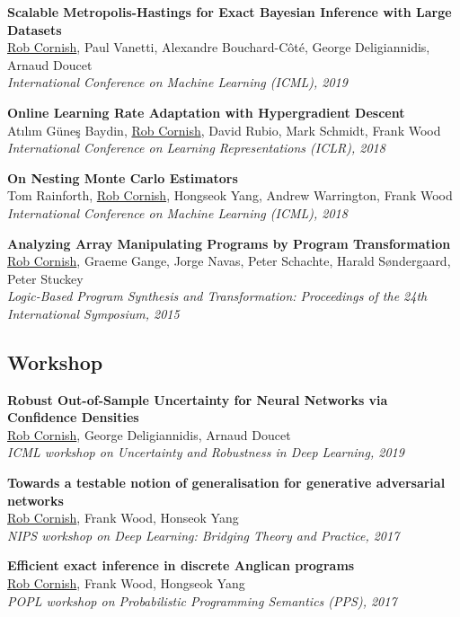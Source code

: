 \documentclass[12pt,a4paper]{article}
\begin{document}
\textbf{Scalable Metropolis-Hastings for Exact Bayesian Inference with Large Datasets} \\
\underline{Rob Cornish}, Paul Vanetti, Alexandre Bouchard-C\^ot\'e, George Deligiannidis, Arnaud Doucet \\
\textit{International Conference on Machine Learning (ICML), 2019}

\noindent
\textbf{Online Learning Rate Adaptation with Hypergradient Descent} \\
At\i l\i m G\"une\c s Baydin, \underline{Rob Cornish}, David Rubio, Mark Schmidt, Frank Wood \\
\textit{International Conference on Learning Representations (ICLR), 2018}

\noindent
\textbf{On Nesting Monte Carlo Estimators} \\
Tom Rainforth, \underline{Rob Cornish}, Hongseok Yang, Andrew Warrington, Frank Wood \\
\textit{International Conference on Machine Learning (ICML), 2018}

\noindent
\textbf{Analyzing Array Manipulating Programs by Program Transformation} \\
\underline{Rob Cornish}, Graeme Gange, Jorge Navas, Peter Schachte, Harald S\o ndergaard, Peter Stuckey \\
\textit{Logic-Based Program Synthesis and Transformation: Proceedings of the 24th International Symposium, 2015}


\subsection*{Workshop}

\textbf{Robust Out-of-Sample Uncertainty for Neural Networks via Confidence Densities} \\
\underline{Rob Cornish}, George Deligiannidis, Arnaud Doucet \\
\textit{ICML workshop on Uncertainty and Robustness in Deep Learning, 2019}

\noindent
\textbf{Towards a testable notion of generalisation for generative adversarial networks} \\
\underline{Rob Cornish}, Frank Wood, Honseok Yang \\
\textit{NIPS workshop on Deep Learning: Bridging Theory and Practice, 2017}

\noindent
\textbf{Efficient exact inference in discrete Anglican programs} \\
\underline{Rob Cornish}, Frank Wood, Hongseok Yang \\
\textit{POPL workshop on Probabilistic Programming Semantics (PPS), 2017}
\end{document}
